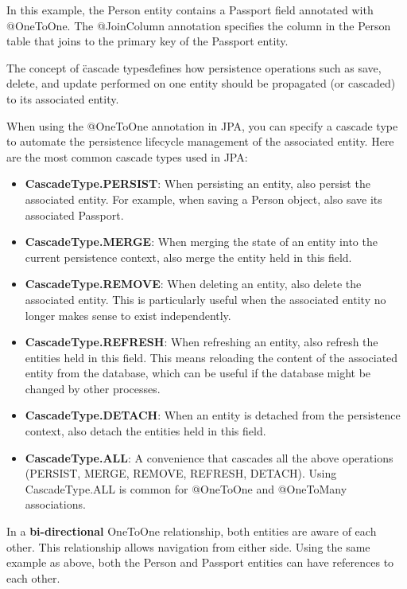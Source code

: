 In this example, the Person entity contains a Passport field annotated with @OneToOne. The @JoinColumn annotation specifies the column in the Person table that joins to the primary key of the Passport entity.

The concept of \"cascade types\" defines how persistence operations such as save, delete, and update performed on one entity should be propagated (or cascaded) to its associated entity. 

When using the @OneToOne annotation in JPA, you can specify a cascade type to automate the persistence lifecycle management of the associated entity. Here are the most common cascade types used in JPA:

\begin{itemize}
\item \textbf{CascadeType.PERSIST}: When persisting an entity, also persist the associated entity.  For example, when saving a Person object, also save its associated Passport.

\item \textbf{CascadeType.MERGE}: When merging the state of an entity into the current persistence context, also merge the entity held in this field.

\item \textbf{CascadeType.REMOVE}: When deleting an entity, also delete the associated entity. This is particularly useful when the associated entity no longer makes sense to exist independently.

\item \textbf{CascadeType.REFRESH}: When refreshing an entity, also refresh the entities held in this field. This means reloading the content of the associated entity from the database, which can be useful if the database might be changed by other processes.

\item \textbf{CascadeType.DETACH}: When an entity is detached from the persistence context, also detach the entities held in this field.

\item \textbf{CascadeType.ALL}: A convenience that cascades all the above operations (PERSIST, MERGE, REMOVE, REFRESH, DETACH). Using CascadeType.ALL is common for @OneToOne and @OneToMany associations.
\end{itemize}

In a \textbf{bi-directional} OneToOne relationship, both entities are aware of each other. This relationship allows navigation from either side. Using the same example as above, both the Person and Passport entities can have references to each other.

